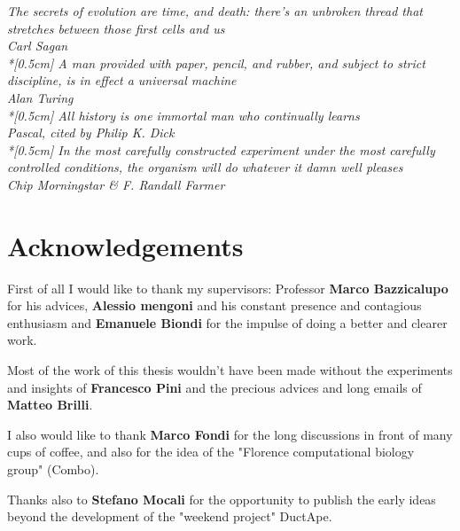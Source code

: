 
\thispagestyle{empty}

\begin{flushright}{\slshape
	\textit{The secrets of evolution are time, and death: there's an unbroken thread that stretches between those first cells and us} \\
	Carl Sagan \\*[0.5cm]
	\textit{A man provided with paper, pencil, and rubber, and subject to strict discipline, is in effect a universal machine} \\
	Alan Turing \\*[0.5cm]
	\textit{All history is one immortal man who continually learns} \\
	Pascal, cited by Philip K. Dick \\*[0.5cm]
	\textit{In the most carefully constructed experiment under the most carefully controlled conditions, the organism will do whatever it damn well pleases}\\
	Chip Morningstar \& F. Randall Farmer}
\end{flushright}



\newpage

\begingroup
\let\clearpage\relax
\let\cleardoublepage\relax
\let\cleardoublepage\relax

\chapter{Acknowledgements}

First of all I would like to thank my supervisors: Professor \textbf{Marco Bazzicalupo} for his advices, \textbf{Alessio mengoni} and his constant presence and contagious enthusiasm and \textbf{Emanuele Biondi} for the impulse of doing a better and clearer work.

Most of the work of this thesis wouldn't have been made without the experiments and insights of \textbf{Francesco Pini} and the precious advices and long emails of \textbf{Matteo Brilli}. 

I also would like to thank \textbf{Marco Fondi} for the long discussions in front of many cups of coffee, and also for the idea of the "Florence computational biology group" (Combo).

Thanks also to \textbf{Stefano Mocali} for the opportunity to publish the early ideas beyond the development of the "weekend project" DuctApe.


